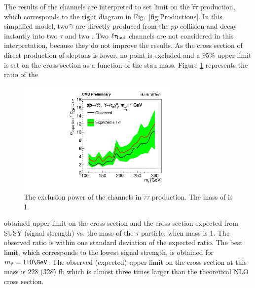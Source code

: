 The results of the \tauTau channels are interpreted to set limit on the $\tilde{\tau}\tilde{\tau}$ production, 
which corresponds to the right diagram in Fig.~\ref{fig:Productions}. 
In this simplified model, two $\tilde{\tau}$ are directly produced from the $pp$ collision and decay instantly 
into two $\tau$ and two \PSGczDo. Two $\ell\tau_{\rm had}$ channels are not considered in this interpretation, because they do not improve the results. 
As the cross section of direct production of sleptons is lower, no point is excluded and a $95\%$ upper limit is set on 
the cross section  as a function of the stau mass. 
Figure \ref{fig:limit_stau_stau} represents the ratio of the 
\begin{linenomath}
\begin{figure}[!htb]
\centering
\includegraphics[width=0.7\textwidth,keepaspectratio=true]{StatisticsFig/ExclusionSTauSTauLsp1.pdf}
\caption{The exclusion power of the \tauTau channels in $\tilde{\tau}\tilde{\tau}$ production. The mass of \PSGczDo is 1\GeV.}
\label{fig:limit_stau_stau}
\end{figure}
\end{linenomath}
obtained upper limit on the cross section and the cross section expected from SUSY (signal strength) vs. the mass of the $\tilde{\tau}$ particle, when \PSGczDo mass is 1\GeV.
The observed ratio is within one standard deviation of  the expected ratio.
The best limit, which corresponds to the lowest signal strength, is obtained for $m_{\tilde{\tau}}=110\GeV$. The observed (expected) upper limit on the cross section at this mass is 228 (328) fb which is almost three times larger than the theoretical NLO cross section.



